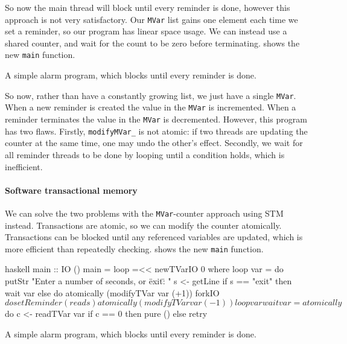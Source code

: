 So now the main thread will block until every reminder is done,
however this approach is not very satisfactory.  Our \verb|MVar| list
gains one element each time we set a reminder, so our program has
linear space usage.  We can instead use a shared counter, and wait for
the count to be zero before terminating.   shows the
new \verb|main| function.

\begin{listing}
\centering
{}
\caption{A simple alarm program, which blocks until every reminder is done.}\label{lst:ch_ex4}
\end{listing}

So now, rather than have a constantly growing list, we just have a
single \verb|MVar|.  When a new reminder is created the value in the
\verb|MVar| is incremented.  When a reminder terminates the value in
the \verb|MVar| is decremented.  However, this program has two flaws.
Firstly, \verb|modifyMVar_| is not atomic: if two threads are updating
the counter at the same time, one may undo the other's effect.
Secondly, we wait for all reminder threads to be done by looping until
a condition holds, which is inefficient.

\paragraph{Software transactional memory}
We can solve the two problems with the \verb|MVar|-counter approach
using STM instead.  Transactions are atomic, so we can modify the
counter atomically.  Transactions can be blocked until any referenced
variables are updated, which is more efficient than repeatedly
checking.   shows the new \verb|main| function.

\begin{listing}
\centering
\begin{cminted}{haskell}
main :: IO ()
main = loop =<< newTVarIO 0 where
  loop var = do
    putStr "Enter a number of seconds, or \"exit\": "
    s <- getLine
    if s == "exit"
      then wait var
      else do
        atomically (modifyTVar var (+1))
        forkIO $ do
          setReminder (read s)
          atomically (modifyTVar var (-1))
        loop var
  wait var = atomically $ do
    c <- readTVar var
    if c == 0 then pure () else retry
\end{cminted}
\caption{A simple alarm program, which blocks until every reminder is done.}\label{lst:ch_ex5}
\end{listing}

